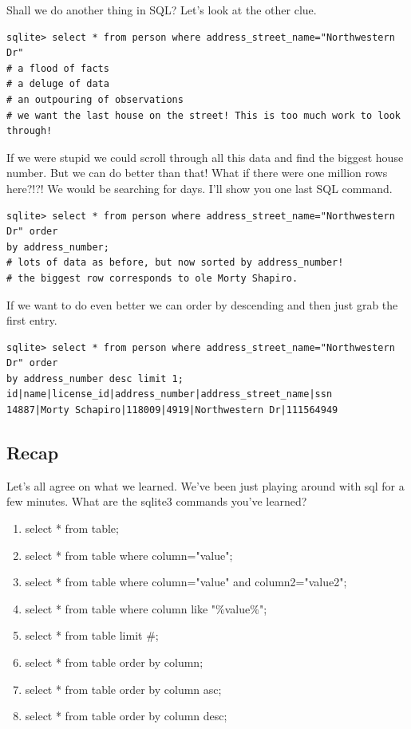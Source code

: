 \documentclass[12pt,a4paper]{article}
\begin{document}
Shall we do another thing in SQL? Let's look at the other clue. 

\begin{lstlisting}[style=term]
sqlite> select * from person where address_street_name="Northwestern Dr"
# a flood of facts
# a deluge of data
# an outpouring of observations
# we want the last house on the street! This is too much work to look through!
\end{lstlisting}

If we were stupid we could scroll through all this data and find the biggest
house number. But we can do better than that! What if there were one million
rows  here?!?! We would be searching for days. I'll show you one last SQL
command.

\begin{lstlisting}[style=term]
sqlite> select * from person where address_street_name="Northwestern Dr" order
by address_number;
# lots of data as before, but now sorted by address_number! 
# the biggest row corresponds to ole Morty Shapiro.
\end{lstlisting}

If we want to do even better we can order by descending and then just grab the
first entry.

\begin{lstlisting}[style=term]
sqlite> select * from person where address_street_name="Northwestern Dr" order
by address_number desc limit 1;
id|name|license_id|address_number|address_street_name|ssn
14887|Morty Schapiro|118009|4919|Northwestern Dr|111564949
\end{lstlisting}

\subsection{Recap}
Let's all agree on what we learned. We've been just playing around with sql for
a few minutes. What are the sqlite3 commands you've learned?

\begin{enumerate}
\item select * from table;
\item select * from table where column="value";
\item select * from table where column="value" and column2="value2";
\item select * from table where column like "\%value\%";
\item select * from table limit \#;
\item select * from table order by column;
\item select * from table order by column asc;
\item select * from table order by column desc;
\end{enumerate}
\end{document}
